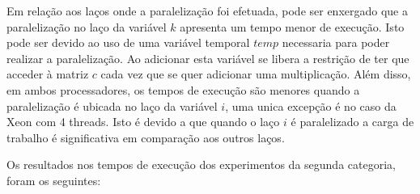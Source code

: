 \documentclass[a4paper,12pt,fleqn]{article}
\begin{document}
Em relação aos laços onde a paralelização foi efetuada, pode ser enxergado que a paralelização no laço da variável $k$ apresenta um tempo menor de execução. Isto pode ser devido ao uso de uma variável temporal $temp$ necessaria para poder realizar a paralelização. Ao adicionar esta variável se libera a restrição de ter que acceder à matriz $c$ cada vez que se quer adicionar uma multiplicação. Além disso, em ambos processadores, os tempos de execução são menores quando a paralelização é ubicada no laço da variável $i$, uma unica excepção é no caso da Xeon com 4 threads. Isto é devido a que quando o laço $i$ é paralelizado a carga de trabalho é significativa em comparação aos outros laços.

Os resultados nos tempos de execução dos experimentos da segunda categoria, foram os seguintes:
\end{document}
